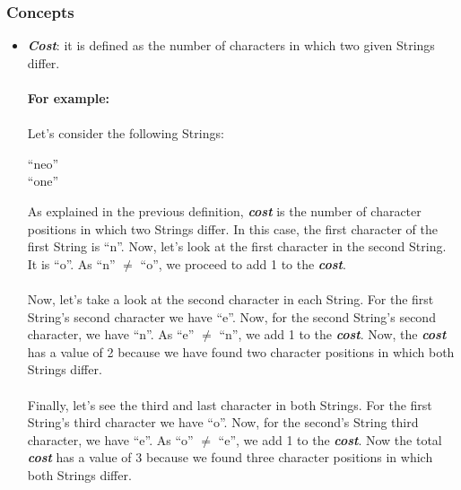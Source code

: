 \documentclass{article}
\begin{document}
	\subsubsection{Concepts}
	\begin{itemize}
		\item \emph{\textbf{Cost}}: it is defined as the number of
		characters in which two given Strings differ.
		\\
		\\
		\textbf{For example:}
		\\
		\\
		Let's consider the following Strings:
		\begin{center}
			``neo''
			\\
			``one''
			\\
		\end{center}
		As explained in the previous definition, \emph{\textbf{cost}}
		is the number of character positions in which
		two Strings differ. In this case, the first
		character of the first String is ``n''. Now,
		let's look at the first character in the second
		String. It is ``o''. As ``n'' $\ne$ ``o'', we
		proceed to add 1 to the \emph{\textbf{cost}}.
		\\
		\\
		Now, let's take a look at the second character in
		each String. For the first String's second character
		we have ``e''. Now, for the second String's second
		character, we have ``n''. As ``e'' $\ne$ ``n'', we
		add 1 to the \emph{\textbf{cost}}. Now, the \emph{\textbf{cost}} has a value of 2
		because we have found two character positions in
		which both Strings differ.
		\\
		\\
		Finally, let's see the third and last character in
		both Strings. For the first String's third character
		we have ``o''. Now, for the second's String third
		character, we have ``e''. As ``o'' $\ne$ ``e'', we
		add 1 to the \emph{\textbf{cost}}. Now the total \emph{\textbf{cost}} has a value
		of 3 because we found three character positions in
		which both Strings differ.
		

\end{itemize}
\end{document}
